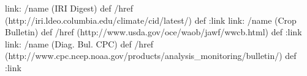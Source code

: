 
\begin{ingrid}

link:
/name (IRI Digest) def
/href (http://iri.ldeo.columbia.edu/climate/cid/latest/) def
:link
link:
/name (Crop Bulletin) def
/href (http://www.usda.gov/oce/waob/jawf/wwcb.html) def
:link
link:
/name (Diag. Bul. CPC) def
/href (http://www.cpc.ncep.noaa.gov/products/analysis_monitoring/bulletin/) def
:link

\end{ingrid}
